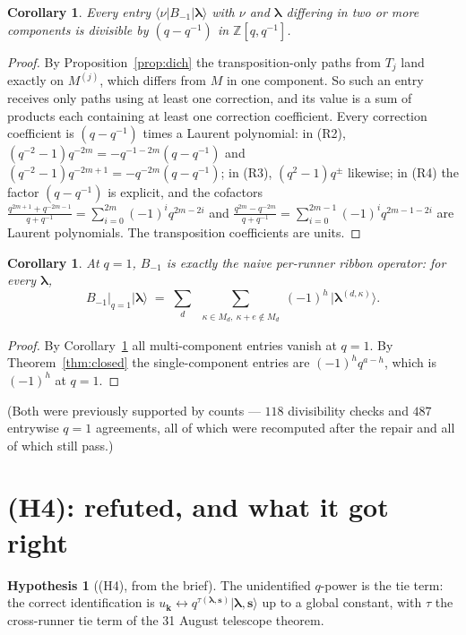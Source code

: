 \documentclass[11pt]{article}
\newtheorem{corollary}[theorem]{Corollary}
\theoremstyle{definition}
\newtheorem{hypothesis}[theorem]{Hypothesis}
\theoremstyle{remark}
\newcommand{\Z}{\mathbb{Z}}
\newcommand{\bl}{\boldsymbol{\lambda}}
\newcommand{\bs}{\mathbf{s}}
\newcommand{\bk}{\mathbf{k}}
\newcommand{\ket}[1]{\lvert #1 \rangle}
\newcommand{\bra}[1]{\langle #1 \rvert}
\begin{document}
\begin{corollary}\label{cor:div}
Every entry $\bra{\nu}B_{-1}\ket{\bl}$ with $\nu$ and $\bl$ differing in two or more
components is divisible by $(q-q^{-1})$ in $\Z[q,q^{-1}]$.
\end{corollary}

\begin{proof}
By Proposition~\ref{prop:dich} the transposition-only paths from $T_j$ land exactly on
$M^{(j)}$, which differs from $M$ in one component. So such an entry receives only paths
using at least one correction, and its value is a sum of products each containing at
least one correction coefficient. Every correction coefficient is $(q-q^{-1})$ times a
Laurent polynomial: in (R2), $(q^{-2}-1)q^{-2m}=-q^{-1-2m}(q-q^{-1})$ and
$(q^{-2}-1)q^{-2m+1}=-q^{-2m}(q-q^{-1})$; in (R3), $(q^{2}-1)q^{\pm}$ likewise; in (R4)
the factor $(q-q^{-1})$ is explicit, and the cofactors
$\frac{q^{2m+1}+q^{-2m-1}}{q+q^{-1}}=\sum_{i=0}^{2m}(-1)^{i}q^{2m-2i}$ and
$\frac{q^{2m}-q^{-2m}}{q+q^{-1}}=\sum_{i=0}^{2m-1}(-1)^{i}q^{2m-1-2i}$
are Laurent polynomials. The transposition coefficients are units.
\end{proof}

\begin{corollary}\label{cor:q1}
At $q=1$, $B_{-1}$ is exactly the naive per-runner ribbon operator: for every $\bl$,
\[
B_{-1}\big|_{q=1}\ket{\bl}\;=\;\sum_{d}\ \sum_{\substack{\kappa\in M_d,\ \kappa+e\notin M_d}}
(-1)^{h}\,\ket{\bl^{(d,\kappa)}} .
\]
\end{corollary}

\begin{proof}
By Corollary~\ref{cor:div} all multi-component entries vanish at $q=1$. By
Theorem~\ref{thm:closed} the single-component entries are $(-1)^{h}q^{a-h}$, which is
$(-1)^{h}$ at $q=1$.
\end{proof}

\noindent (Both were previously supported by counts --- $118$ divisibility checks and
$487$ entrywise $q=1$ agreements, all of which were recomputed after the repair and all
of which still pass.)

\section{(H4): refuted, and what it got right}\label{sec:h4}

\begin{hypothesis}[(H4), from the brief]
The unidentified $q$-power is the tie term: the correct identification is
$u_{\bk}\leftrightarrow q^{\tau(\bl,\bs)}\ket{\bl,\bs}$ up to a global constant, with
$\tau$ the cross-runner tie term of the 31 August telescope theorem.
\end{hypothesis}
\end{document}
